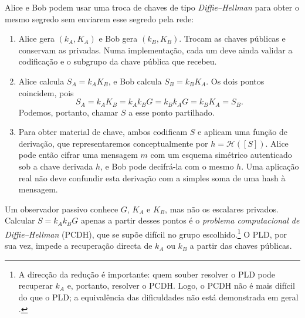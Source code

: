 Alice e Bob podem usar uma troca de chaves de tipo {\em Diffie--Hellman}
\cite{Diffie-Hellman} para obter o mesmo segredo sem enviarem esse segredo pela
rede:


\begin{enumerate}

	\item Alice gera \((k_A,K_A)\) e Bob gera \((k_B,K_B)\). Trocam as chaves
    públicas e conservam as privadas. Numa implementação, cada um deve ainda
    validar a codificação e o subgrupo da chave pública que recebeu.
    \item Alice calcula \(S_A=k_AK_B\), e Bob calcula \(S_B=k_BK_A\). Os
    dois pontos coincidem, pois
    \[
    S_A=k_AK_B=k_Ak_BG=k_Bk_AG=k_BK_A=S_B.
    \]
    Podemos, portanto, chamar \(S\) a esse ponto partilhado.


    \item Para obter material de chave, ambos codificam \(S\) e aplicam uma
    função de derivação, que representaremos conceptualmente por
    \(h=\mathcal{H}([S])\). Alice pode então cifrar uma mensagem \(m\) com um
    esquema simétrico autenticado sob a chave derivada \(h\), e Bob pode
    decifrá-la com o mesmo \(h\). Uma aplicação real não deve confundir esta
    derivação com a simples soma de uma hash à mensagem.

\end{enumerate}

Um observador passivo conhece \(G\), \(K_A\) e \(K_B\), mas não os escalares
privados. Calcular \(S=k_Ak_BG\) apenas a partir desses pontos é o {\em problema
computacional de Diffie--Hellman} (PCDH), que se supõe difícil no grupo
escolhido.\footnote{A direcção da redução é importante: quem souber resolver o
PLD pode recuperar \(k_A\) e, portanto, resolver o PCDH. Logo, o PCDH não é mais
difícil do que o PLD; a equivalência das dificuldades não está demonstrada em
geral \cite{diffie-hellman-problem}.} O PLD, por sua vez, impede a recuperação
directa de \(k_A\) ou \(k_B\) a partir das chaves públicas.

